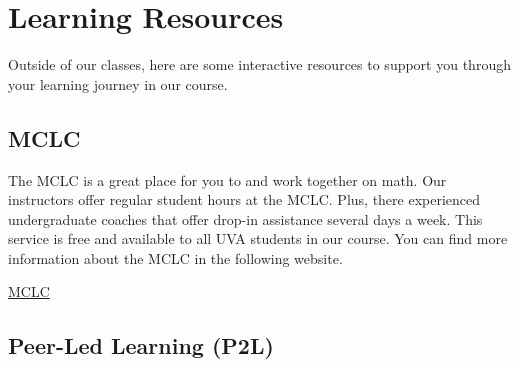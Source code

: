 \documentclass[12pt]{article}
\begin{document}
	\section{Learning Resources}

        Outside of our classes, here are some interactive resources to support you through your learning journey in our course.


        
        


        
        \subsection{MCLC}

        The MCLC is a great place for you to and work together on math. Our instructors offer regular student hours at the MCLC. Plus, there experienced undergraduate coaches that offer drop-in assistance several days a week. This service is free and available to all UVA students in our course. You can find more information about the MCLC in the following website.

        \href{https://academicsupport.virginia.edu/mclc-math-collaborative-learning-center}{MCLC}

        \subsection{Peer-Led Learning (P2L)}
        
\end{document}
